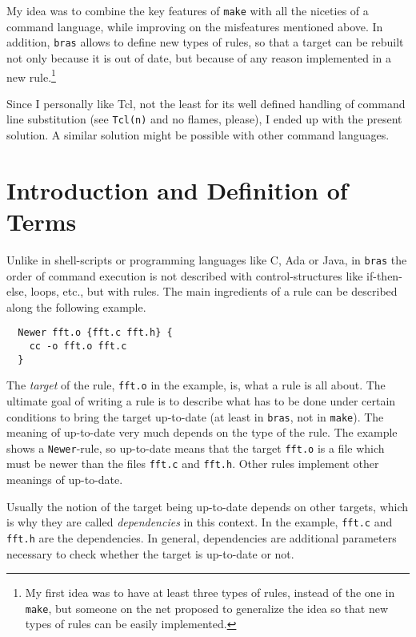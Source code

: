\documentclass[12pt]{article}
\newcommand{\bras}{\texttt{bras}}
\newcommand{\make}{\texttt{make}}
\begin{document}
My idea was to combine the key features of \texttt{make} with all the
niceties of a command language, while improving on the misfeatures
mentioned above. In addition, \bras{} allows to define new types of
rules, so that a target can be rebuilt not only because it is out of
date, but because of any reason implemented in a new rule.\footnote{My
first idea was to have at least three types of rules, instead of the one
in \make{}, but someone on the net proposed to generalize the idea so
that new types of rules can be easily implemented.}

Since I personally like Tcl, not the least for its well defined
handling of command line substitution (see \texttt{Tcl(n)} and no
flames, please), I ended up with the present solution. A similar
solution might be possible with other command languages.


\section{Introduction and Definition of Terms}
\label{SecDefTerms}

Unlike in shell-scripts or programming languages like C, Ada or Java,
in \bras{} the order of command execution is not described with
control-structures like if-then-else, loops, etc., but with rules.
The main ingredients of a rule can be described along the following
example.

\begin{verbatim}
  Newer fft.o {fft.c fft.h} {
    cc -o fft.o fft.c
  }
\end{verbatim}

The \textit{target} of the rule, \texttt{fft.o} in the example, is,
what a rule is all about. The ultimate goal of writing a rule is to
describe what has to be done under certain conditions to bring the
target up-to-date (at least in \bras{}, not
in \make{}). The meaning of up-to-date very much depends on the
type of the rule. The example shows a \texttt{Newer}-rule, so
up-to-date means that the target \texttt{fft.o} is a file
which must be newer than the files \texttt{fft.c} and \texttt{fft.h}.
Other rules implement other meanings of up-to-date.

Usually the notion of the target being up-to-date depends on other
targets, which is why they are called \textit{dependencies} in this
context. In the example, \texttt{fft.c} and \texttt{fft.h} are the
dependencies. In general, dependencies are additional parameters
necessary to check whether the target is up-to-date or not.
\end{document}
